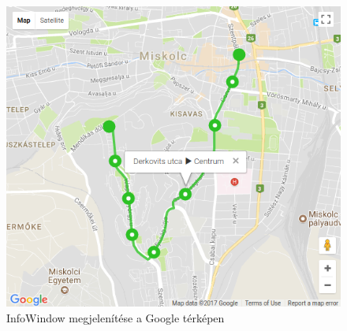 \begin{figure}[h!]
\centering
\includegraphics[scale=0.7]{kepek/terkep.png}
\caption{InfoWindow megjelenítése a Google térképen}
\label{fig:terkep}
\end{figure}
